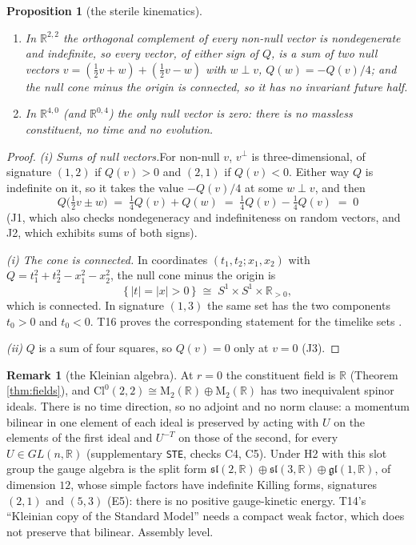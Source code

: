 \documentclass[11pt]{article}
\newtheorem{proposition}[theorem]{Proposition}
\theoremstyle{definition}
\newtheorem{remark}[theorem]{Remark}
\newcommand{\Cl}{\mathrm{Cl}}
\newcommand{\R}{\mathbb{R}}
\newcommand{\sll}{\mathfrak{sl}}
\newcommand{\gl}{\mathfrak{gl}}
\newcommand{\file}[1]{\texttt{#1}}
\newcommand{\Mat}{\mathrm{M}}
\newcommand{\pstep}[1]{\par\smallskip\noindent\textit{#1.}\enspace}
\newcommand{\pitem}[1]{\par\smallskip\noindent\textit{#1}\enspace}
\begin{document}
\begin{proposition}[the sterile kinematics]\label{prop:sterile}
\begin{enumerate}
\item[(i)] In $\R^{2,2}$ the orthogonal complement of every non-null vector is nondegenerate and indefinite, so every vector, of either sign of $Q$, is a sum of two null vectors $v = (\tfrac{1}{2}v + w) + (\tfrac{1}{2}v - w)$ with $w \perp v$, $Q(w) = -Q(v)/4$; and the null cone minus the origin is connected, so it has no invariant future half.
\item[(ii)] In $\R^{4,0}$ (and $\R^{0,4}$) the only null vector is zero: there is no massless constituent, no time and no evolution.
\end{enumerate}
\end{proposition}

\begin{proof}
\textit{(i) Sums of null vectors.}\enspace For non-null $v$, $v^{\perp}$ is three-dimensional, of signature $(1,2)$ if $Q(v) > 0$ and $(2,1)$ if $Q(v) < 0$. Either way $Q$ is indefinite on it, so it takes the value $-Q(v)/4$ at some $w \perp v$, and then
\[
Q\bigl(\tfrac{1}{2}v \pm w\bigr) \;=\; \tfrac{1}{4}Q(v) + Q(w) \;=\; \tfrac{1}{4}Q(v) - \tfrac{1}{4}Q(v) \;=\; 0
\]
(J1, which also checks nondegeneracy and indefiniteness on random vectors, and J2, which exhibits sums of both signs).

\pstep{(i) The cone is connected} In coordinates $(t_{1}, t_{2}; x_{1}, x_{2})$ with $Q = t_{1}^{2} + t_{2}^{2} - x_{1}^{2} - x_{2}^{2}$, the null cone minus the origin is
\[
\bigl\{\, |t| = |x| > 0 \,\bigr\} \;\cong\; S^{1} \times S^{1} \times \R_{>0},
\]
which is connected. In signature $(1,3)$ the same set has the two components $t_{0} > 0$ and $t_{0} < 0$. T16 proves the corresponding statement for the timelike sets \cite[Lem.~4.4]{ButlerT16}.

\pitem{(ii)} $Q$ is a sum of four squares, so $Q(v) = 0$ only at $v = 0$ (J3).
\end{proof}

\begin{remark}[the Kleinian algebra]\label{rem:kleinian}
At $r = 0$ the constituent field is $\R$ (Theorem \ref{thm:fields}), and $\Cl^{0}(2,2) \cong \Mat_{2}(\R) \oplus \Mat_{2}(\R)$ has two inequivalent spinor ideals. There is no time direction, so no adjoint and no norm clause: a momentum bilinear in one element of each ideal is preserved by acting with $U$ on the elements of the first ideal and $U^{-T}$ on those of the second, for every $U \in GL(n,\R)$ (supplementary \file{STE}, checks C4, C5). Under H2 with this slot group the gauge algebra is the split form $\sll(2,\R) \oplus \sll(3,\R) \oplus \gl(1,\R)$, of dimension $12$, whose simple factors have indefinite Killing forms, signatures $(2,1)$ and $(5,3)$ (E5): there is no positive gauge-kinetic energy. T14's ``Kleinian copy of the Standard Model'' \cite[Cor.~3.11]{ButlerT14} needs a compact weak factor, which does not preserve that bilinear. Assembly level.
\end{remark}
\end{document}
